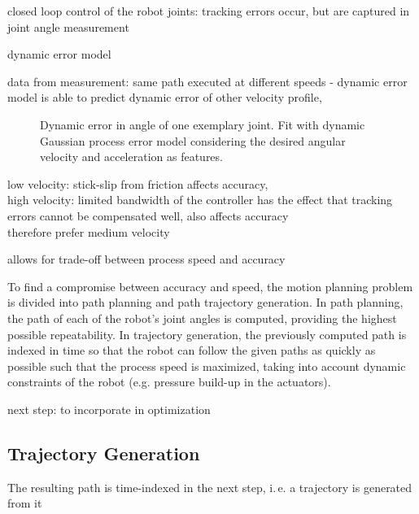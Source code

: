 \documentclass[5p,times,procedia]{elsarticle}
\begin{document}
closed loop control of the robot joints: tracking errors occur, but are captured in joint angle measurement

dynamic error model

data from measurement: same path executed at different speeds - dynamic error model is able to predict dynamic error of other velocity profile,

\begin{figure}[h]
	\centering
	
	\caption{Dynamic error in angle of one exemplary joint. Fit with dynamic Gaussian process error model considering the desired angular velocity and acceleration as features.}
	\label{fig:error_sources}
\end{figure}

low velocity: stick-slip from friction affects accuracy,\\
high velocity: limited bandwidth of the controller has the effect that tracking errors cannot be compensated well, also affects accuracy \\
therefore prefer medium velocity

allows for trade-off between process speed and accuracy

To find a compromise between accuracy and speed, the motion planning problem is divided into path planning and path trajectory generation. In path planning, the path of each of the robot’s joint angles is computed, providing the highest possible repeatability. In trajectory generation, the previously computed path is indexed in time so that the robot can follow the given paths as quickly as possible such that the process speed is maximized, taking into account dynamic constraints of the robot (e.g. pressure build-up in the actuators).


next step: to incorporate in optimization

\subsection{Trajectory Generation}
The resulting path is time-indexed in the next step, i.\,e. a trajectory is generated from it
\end{document}
